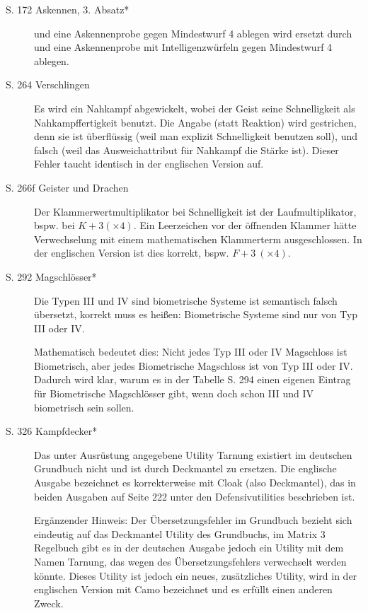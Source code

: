 \documentclass[a4paper]{scrartcl}
\newcommand{\ditoengl}{Dieser Fehler taucht identisch in der englischen Version auf. }
\begin{document}
\begin{description}
 \item[S. 172 Askennen, 3. Absatz*] \glqq und eine Askennenprobe gegen Mindestwurf 4 ablegen\grqq{} wird ersetzt durch \glqq und eine Askennenprobe mit Intelligenzwürfeln gegen Mindestwurf 4 ablegen\grqq.

 \item[S. 264 Verschlingen]
Es wird ein Nahkampf abgewickelt, wobei der Geist seine Schnelligkeit als Nahkampffertigkeit benutzt.
Die Angabe \glqq(statt Reaktion)\grqq{} wird gestrichen, denn sie ist überflüssig (weil man explizit Schnelligkeit benutzen soll), und falsch (weil das Ausweichattribut für Nahkampf die Stärke ist). \ditoengl

 \item[S. 266f Geister und Drachen]
Der Klammerwertmultiplikator bei Schnelligkeit ist der Laufmultiplikator, bspw. bei $K+3(\times4)$. Ein Leerzeichen vor der öffnenden Klammer hätte Verwechselung mit einem mathematischen Klammerterm ausgeschlossen. In der englischen Version ist dies korrekt, bspw. $F+3\ (\times4)$.

 \item[S. 292 Magschlösser*]
\glqq Die Typen III und IV sind biometrische Systeme\grqq{} ist semantisch falsch übersetzt, korrekt muss es heißen: \glqq Biometrische Systeme sind nur von Typ III oder IV\grqq.

Mathematisch bedeutet dies: Nicht jedes Typ III oder IV Magschloss ist Biometrisch, aber jedes Biometrische Magschloss ist von Typ III oder IV.
Dadurch wird klar, warum es in der Tabelle S. 294 einen eigenen Eintrag für Biometrische Magschlösser gibt, wenn doch schon III und IV biometrisch sein sollen.

 \item[S. 326 Kampfdecker*]
Das unter Ausrüstung angegebene Utility \glqq Tarnung\grqq{} existiert im deutschen Grundbuch nicht und ist durch \glqq Deckmantel\grqq{} zu ersetzen. Die englische Ausgabe bezeichnet es korrekterweise mit Cloak (also Deckmantel), das in beiden Ausgaben auf Seite 222 unter den Defensivutilities beschrieben ist.

Ergänzender Hinweis: Der Übersetzungsfehler im Grundbuch bezieht sich eindeutig auf das Deckmantel Utility des Grundbuchs, im Matrix 3 Regelbuch gibt es in der deutschen Ausgabe jedoch ein Utility mit dem Namen \glqq Tarnung\grqq, das wegen des Übersetzungsfehlers verwechselt werden könnte.
Dieses Utility ist jedoch ein neues, zusätzliches Utility, wird in der englischen Version mit \glqq Camo\grqq{} bezeichnet und es erfüllt einen anderen Zweck.
\end{description}
\end{document}
